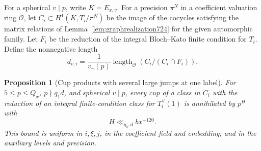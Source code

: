 \documentclass[a4paper,11pt]{article}
\newtheorem{proposition}{Proposition}[section]
\theoremstyle{definition}
\theoremstyle{remark}
\numberwithin{equation}{section}
\begin{document}
For a spherical \(v\mid p\), write \(K=E_{x,v}\).
For a precision \(\pi^N\) in a coefficient valuation
ring \(\mathcal O\), let \(C_i\subset H^1(K,T_i/\pi^N)\)
be the image of the cocycles satisfying the matrix
relations of Lemma~\ref{lem:graphrealization724} for
the given automorphic family. Let \(F_i\) be the
reduction of the integral Bloch--Kato finite condition
for \(T_i\). Define the nonnegative length
\[
       d_{v,i}=\frac{1}{v_\pi(p)}
             \operatorname{length}_{\mathcal O}\!
                   \left(C_i/(C_i\cap F_i)\right).
\]

\begin{proposition}[Cup products with several large jumps at one label]
\leavevmode\label{prop:highsparse789}
For \(5\le p\le Q_x\), \(p\nmid q_1d\), and spherical
\(v\mid p\), every cup of a class in \(C_i\) with the
reduction of an integral finite-condition class for
\(T_i^\vee(1)\) is annihilated by \(p^H\) with
\[
                    H\ll_{q_0,d} b x^{-120}.
\]
This bound is uniform in \(i,\xi,j\), in the coefficient
field and embedding, and in the auxiliary levels and
precision.
\end{proposition}
\end{document}
